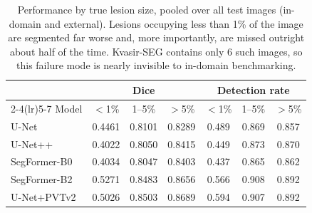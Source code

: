 \begin{table}[t]
\centering
\footnotesize
\caption{Performance by true lesion size, pooled over all test images (in-domain and external). Lesions occupying less than 1\% of the image are segmented far worse and, more importantly, are missed outright about half of the time. Kvasir-SEG contains only 6 such images, so this failure mode is nearly invisible to in-domain benchmarking.}
\label{tab:size}
\begin{tabular}{lcccccc}
\toprule
 & \multicolumn{3}{c}{Dice} & \multicolumn{3}{c}{Detection rate} \\
\cmidrule(lr){2-4}\cmidrule(lr){5-7}
Model & $<$1\% & 1--5\% & $>$5\% & $<$1\% & 1--5\% & $>$5\% \\
\midrule
U-Net & 0.4461 & 0.8101 & 0.8289 & 0.489 & 0.869 & 0.857 \\
U-Net++ & 0.4022 & 0.8050 & 0.8415 & 0.449 & 0.873 & 0.870 \\
SegFormer-B0 & 0.4034 & 0.8047 & 0.8403 & 0.437 & 0.865 & 0.862 \\
SegFormer-B2 & 0.5271 & 0.8483 & 0.8656 & 0.566 & 0.908 & 0.892 \\
U-Net+PVTv2 & 0.5026 & 0.8503 & 0.8689 & 0.594 & 0.907 & 0.892 \\
\bottomrule
\end{tabular}
\end{table}
